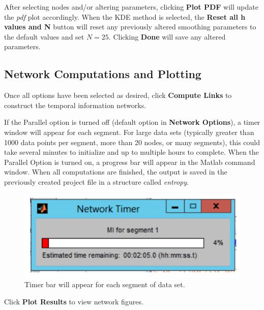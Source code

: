 \documentclass[a4paper]{article}
\begin{document}
After selecting nodes and/or altering parameters, clicking \textbf{Plot PDF} will update the \textit{pdf} plot accordingly.  When the KDE method is selected, the \textbf{Reset all h values and N} button will reset any previously altered smoothing parameters to the default values and set $N=25$.  Clicking \textbf{Done} will save any altered parameters.

\subsection{Network Computations and Plotting}

Once all options have been selected as desired, click \textbf{Compute Links} to construct the temporal information networks.

If the Parallel option is turned off (default option in \textbf{Network Options}), a timer window will appear for each segment.  For large data sets (typically greater than 1000 data points per segment, more than 20 nodes, or many segments), this could take several minutes to initialize and up to multiple hours to complete. When the Parallel Option is turned on, a progress bar will appear in the Matlab command window.  When all computations are finished, the output is saved in the previously created project file in a structure called \textit{entropy}.

\begin{figure}[h!]\label{fig:timerbar}
\begin{center}
\includegraphics[scale=.5]{Image_timerbar.pdf}
\caption{Timer bar will appear for each segment of data set.}
\end{center}
\end{figure}

Click \textbf{Plot Results} to view network figures.  
\end{document}
